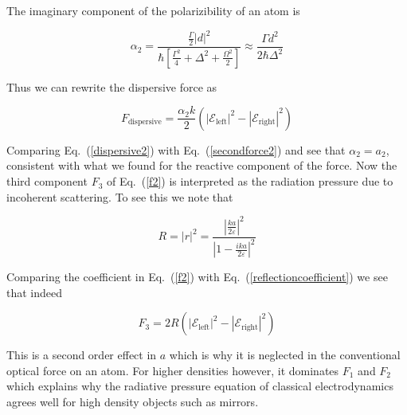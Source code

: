\documentclass[twocolumn,english,pra,aps,superscriptaddress,floatfix]{revtex4-1}
\begin{document}
The imaginary component of the polarizibility of an atom is \cite{cohentannoudji}


\begin{equation}
\alpha_{2}=\frac{\frac{\Gamma}{2}\left|d\right|^{2}}{\hbar\left[\frac{\Gamma^{2}}{4}+\Delta^{2}+\frac{\Omega^{2}}{2}\right]}\approx\frac{\Gamma d^{2}}{2\hbar\Delta^{2}}
\label{polarizibility2}
\end{equation}

Thus we can rewrite the dispersive force as

\begin{equation}
F_{\mathrm{dispersive}}=\frac{\alpha_{2}k}{2}\left(\left|\mathcal{E}_{\mathrm{left}}\right|^{2}-\left|\mathcal{E}_{\mathrm{right}}\right|^{2}\right)
\label{dispersive2}
\end{equation}


Comparing Eq.\ (\ref{dispersive2}) with Eq.\ (\ref{secondforce2}) and see that $\alpha_{2}=a_{2}$, consistent with what we found for the reactive component of the force.  Now the third component $F_{3}$ of Eq.\ (\ref{f2}) is interpreted as the radiation pressure due to incoherent scattering.  To see this we note that

\begin{equation}
R=\left|r\right|^{2}=\frac{\left|\frac{ka}{2\varepsilon}\right|^{2}}{\left|1-\frac{ika}{2\varepsilon}\right|^{2}}
\label{reflectioncoefficient}
\end{equation}

Comparing the coefficient in Eq.\ (\ref{f2}) with Eq.\ (\ref{reflectioncoefficient}) we see that indeed

\begin{equation}
F_{3}=2 R \left(\left|\mathcal{E}_{\mathrm{left}}\right|^{2}-\left|\mathcal{E}_{\mathrm{right}}\right|^{2}\right)
\label{incoherentforce}
\end{equation}

This is a second order effect in $a$ which is why it is neglected in the conventional optical force on an atom.  For higher densities however, it dominates $F_{1}$ and $F_{2}$ which explains why the radiative pressure equation of classical electrodynamics \cite{griffiths} agrees well for high density objects such as mirrors.  
\end{document}
